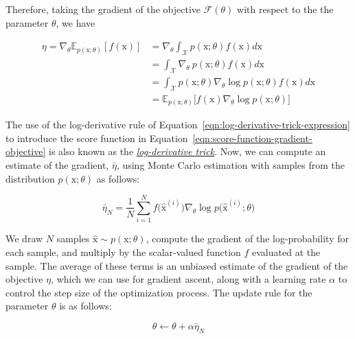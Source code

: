 \noindent Therefore, taking the gradient of the objective $\mathcal{F}(\theta)$ with respect to the the parameter $\theta$, we have

\begin{equation}\label{eqn:score-function-gradient-objective}
    \begin{split}
        \eta = \nabla_{\theta} \mathbb{E}_{p(\mathrm{x};\theta)}[f(\mathrm{x})] &= \nabla_{\theta}\int_{\mathcal{X}} p(\mathrm{x};\theta) f(\mathrm{x}) d\mathrm{x} \\
        &= \int_\mathcal{X} \nabla_{\theta}~p(\mathrm{x}; \theta)f(\mathrm{x})d\mathrm{x} \\
        &= \int_{\mathcal{X}}p(\mathrm{x};\theta)\nabla_{\theta}\log p(\mathrm{x}; \theta) f(\mathrm{x})d\mathrm{x} \\
        &=\mathbb{E}_{p(\mathrm{x};\theta)}\big[f(\mathrm{x})\nabla_{\theta}\log p(\mathrm{x};\theta) \big] 
    \end{split}
\end{equation}

\noindent The use of the log-derivative rule of Equation~\ref{eqn:log-derivative-trick-expression} to introduce the score function in Equation~\ref{eqn:score-function-gradient-objective} is also known as the \href{https://blog.shakirm.com/2015/11/machine-learning-trick-of-the-day-5-log-derivative-trick/}{\textit{log-derivative trick}}. Now, we can compute an estimate of the gradient, $\bar{\eta}$, using Monte Carlo estimation with samples from the distribution $p(\mathrm{x};\theta)$ as follows:

\begin{equation}\label{eqn:score-function-gradient-estimator}
    \bar{\eta}_{N} = \frac{1}{N}\sum_{i=1}^{N}f\big(\hat{\mathrm{x}}^{(i)}\big) \nabla_{\theta}\log p\big(\hat{\mathrm{x}}^{(i)};\theta\big)
\end{equation}

\noindent We draw $N$ samples $\hat{\mathrm{x}}\sim p(\mathrm{x};\theta)$, compute the gradient of the log-probability for each sample, and multiply by the scalar-valued function $f$ evaluated at the sample. The average of these terms is an unbiased estimate of the gradient of the objective $\eta$, which we can use for gradient ascent, along with a learning rate $\alpha$ to control the step size of the optimization process. The update rule for the parameter $\theta$ is as follows:

\begin{equation}\label{eqn:gradient-ascent}
    \theta \leftarrow \theta + \alpha \bar{\eta}_{N}
\end{equation}

